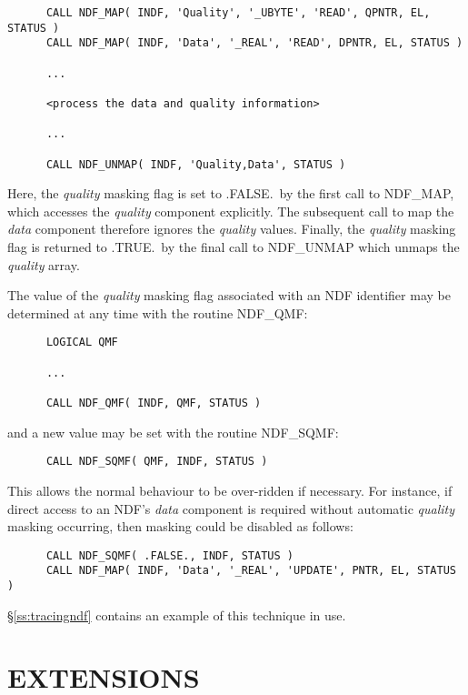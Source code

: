 \documentclass[twoside,11pt]{article}
\newcommand{\htmlref}[2]{#1}
\newcommand{\xlabel}[1]{}
\newcommand{\st}[1]{{\em{#1}}}
\begin{document}
\small
\begin{verbatim}
      CALL NDF_MAP( INDF, 'Quality', '_UBYTE', 'READ', QPNTR, EL, STATUS )
      CALL NDF_MAP( INDF, 'Data', '_REAL', 'READ', DPNTR, EL, STATUS )

      ...

      <process the data and quality information>

      ...

      CALL NDF_UNMAP( INDF, 'Quality,Data', STATUS )
\end{verbatim}
\normalsize

Here, the \st{quality\/} masking flag is set to .FALSE.\ by the first call to
NDF\_MAP,  which accesses the \st{quality\/} component explicitly. 
The subsequent call to map the \st{data\/} component therefore ignores the
\st{quality\/} values.
Finally, the \st{quality\/} masking flag is returned to .TRUE.\ by the final call
to  NDF\_UNMAP which unmaps the \st{quality\/} array.

The value of the \st{quality\/} masking flag associated with an NDF identifier
may be determined at any time with the routine \htmlref{NDF\_QMF}{NDF_QMF}:

\small
\begin{verbatim}
      LOGICAL QMF

      ...

      CALL NDF_QMF( INDF, QMF, STATUS )
\end{verbatim}
\normalsize

and a new value may be set with the routine \htmlref{NDF\_SQMF}{NDF_SQMF}:

\small
\begin{verbatim}
      CALL NDF_SQMF( QMF, INDF, STATUS )
\end{verbatim}
\normalsize

This allows the normal behaviour to be over-ridden if necessary.
For instance, if direct access to an NDF's \st{data\/} component is required 
without automatic \st{quality\/} masking occurring, then masking could be
disabled as follows:

\small
\begin{verbatim}
      CALL NDF_SQMF( .FALSE., INDF, STATUS )
      CALL NDF_MAP( INDF, 'Data', '_REAL', 'UPDATE', PNTR, EL, STATUS )
\end{verbatim}
\normalsize

\S\ref{ss:tracingndf} contains an example of this technique in use.


\section{\xlabel{extensions}EXTENSIONS}
\end{document}
